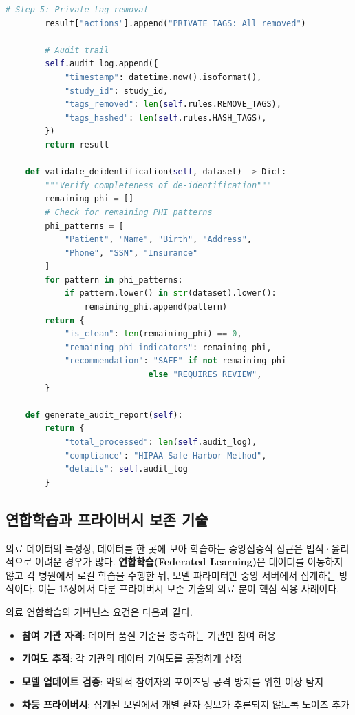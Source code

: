 \begin{lstlisting}[language=Python, caption={DICOM 의료영상 비식별화 파이프라인}, label={lst:dicom_deidentify}]
        # Step 5: Private tag removal
        result["actions"].append("PRIVATE_TAGS: All removed")

        # Audit trail
        self.audit_log.append({
            "timestamp": datetime.now().isoformat(),
            "study_id": study_id,
            "tags_removed": len(self.rules.REMOVE_TAGS),
            "tags_hashed": len(self.rules.HASH_TAGS),
        })
        return result

    def validate_deidentification(self, dataset) -> Dict:
        """Verify completeness of de-identification"""
        remaining_phi = []
        # Check for remaining PHI patterns
        phi_patterns = [
            "Patient", "Name", "Birth", "Address",
            "Phone", "SSN", "Insurance"
        ]
        for pattern in phi_patterns:
            if pattern.lower() in str(dataset).lower():
                remaining_phi.append(pattern)
        return {
            "is_clean": len(remaining_phi) == 0,
            "remaining_phi_indicators": remaining_phi,
            "recommendation": "SAFE" if not remaining_phi
                             else "REQUIRES_REVIEW",
        }

    def generate_audit_report(self):
        return {
            "total_processed": len(self.audit_log),
            "compliance": "HIPAA Safe Harbor Method",
            "details": self.audit_log
        }
\end{lstlisting}

\subsection{연합학습과 프라이버시 보존 기술}
\label{sec:16.3.2}

의료 데이터의 특성상, 데이터를 한 곳에 모아 학습하는 중앙집중식 접근은 법적·윤리적으로 어려운 경우가 많다. \textbf{연합학습(Federated Learning)}은 데이터를 이동하지 않고 각 병원에서 로컬 학습을 수행한 뒤, 모델 파라미터만 중앙 서버에서 집계하는 방식이다. 이는 15장에서 다룬 프라이버시 보존 기술의 의료 분야 핵심 적용 사례이다.

의료 연합학습의 거버넌스 요건은 다음과 같다.
\begin{itemize}
 \item \textbf{참여 기관 자격}: 데이터 품질 기준을 충족하는 기관만 참여 허용
 \item \textbf{기여도 추적}: 각 기관의 데이터 기여도를 공정하게 산정
 \item \textbf{모델 업데이트 검증}: 악의적 참여자의 포이즈닝 공격 방지를 위한 이상 탐지
 \item \textbf{차등 프라이버시}: 집계된 모델에서 개별 환자 정보가 추론되지 않도록 노이즈 추가
\end{itemize}

